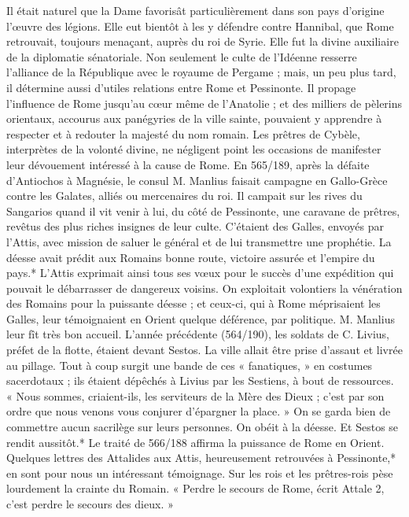 \documentclass[a4paper, 11pt, oneside, polutonikogreek, french]{article}
\begin{document}
Il était naturel que la Dame favorisât particulièrement dans son pays d'origine l'œuvre des légions. Elle eut bientôt à les y défendre contre Hannibal, que Rome retrouvait, toujours menaçant, auprès du roi de Syrie. Elle fut la divine auxiliaire de la diplomatie sénatoriale. Non seulement le culte de l'Idéenne resserre l'alliance de la République avec le royaume de Pergame ; mais, un peu plus tard, il détermine aussi d'utiles relations entre Rome et Pessinonte. Il propage l'influence de Rome jusqu'au cœur même de l'Anatolie ; et des milliers de pèlerins orientaux, accourus aux panégyries de la ville sainte, pouvaient y apprendre à respecter et à redouter la majesté du nom romain. Les prêtres de Cybèle, interprètes de la volonté divine, ne négligent point les occasions de manifester leur dévouement intéressé à la cause de Rome. En 565/189, après la défaite d'Antiochos à Magnésie, le consul M. Manlius faisait campagne en Gallo-Grèce contre les Galates, alliés ou mercenaires du roi. Il campait sur les rives du Sangarios quand il vit venir à lui, du côté de Pessinonte, une caravane de prêtres, revêtus des plus riches insignes de leur culte. C'étaient des Galles, envoyés par l'Attis, avec mission de saluer le général et de lui transmettre une prophétie. La déesse avait prédit aux Romains bonne route, victoire assurée et l'empire du pays.* L'Attis exprimait ainsi tous ses vœux pour le succès d'une expédition qui pouvait le débarrasser de dangereux voisins. On exploitait volontiers la vénération des Romains pour la puissante déesse ; et ceux-ci, qui à Rome méprisaient les Galles, leur témoignaient en Orient quelque déférence, par politique. M. Manlius leur fît très bon accueil. L'année précédente (564/190), les soldats de C. Livius, préfet de la flotte, étaient devant Sestos. La ville allait être prise d'assaut et livrée au pillage. Tout à coup surgit une bande de ces « fanatiques, » en costumes sacerdotaux ; ils étaient dépêchés à Livius par les Sestiens, à bout de ressources. « Nous sommes, criaient-ils, les serviteurs de la Mère des Dieux ; c'est par son ordre que nous venons vous conjurer d'épargner la place. » On se garda bien de commettre aucun sacrilège sur leurs personnes. On obéit à la déesse. Et Sestos se rendit aussitôt.* Le traité de 566/188 affirma la puissance de Rome en Orient. Quelques lettres des Attalides aux Attis, heureusement retrouvées à Pessinonte,* en sont pour nous un intéressant témoignage. Sur les rois et les prêtres-rois pèse lourdement la crainte du Romain. « Perdre le secours de Rome, écrit Attale 2, c'est perdre le secours des dieux. »
\end{document}
